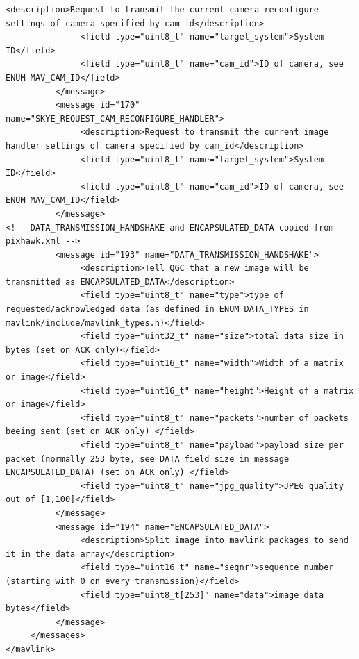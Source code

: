\begin{lstlisting}[captionpos=b, caption="Definition of \textsc{Skye} specific Mavlink messages", label=app_xml]
               <description>Request to transmit the current camera reconfigure settings of camera specified by cam_id</description>
               <field type="uint8_t" name="target_system">System ID</field>
               <field type="uint8_t" name="cam_id">ID of camera, see ENUM MAV_CAM_ID</field>
          </message>
          <message id="170" name="SKYE_REQUEST_CAM_RECONFIGURE_HANDLER">
               <description>Request to transmit the current image handler settings of camera specified by cam_id</description>
               <field type="uint8_t" name="target_system">System ID</field>
               <field type="uint8_t" name="cam_id">ID of camera, see ENUM MAV_CAM_ID</field>
          </message>
<!-- DATA_TRANSMISSION_HANDSHAKE and ENCAPSULATED_DATA copied from pixhawk.xml -->
          <message id="193" name="DATA_TRANSMISSION_HANDSHAKE">
               <description>Tell QGC that a new image will be transmitted as ENCAPSULATED_DATA</description>
               <field type="uint8_t" name="type">type of requested/acknowledged data (as defined in ENUM DATA_TYPES in mavlink/include/mavlink_types.h)</field>
               <field type="uint32_t" name="size">total data size in bytes (set on ACK only)</field>
               <field type="uint16_t" name="width">Width of a matrix or image</field>
               <field type="uint16_t" name="height">Height of a matrix or image</field>
               <field type="uint8_t" name="packets">number of packets beeing sent (set on ACK only) </field>
               <field type="uint8_t" name="payload">payload size per packet (normally 253 byte, see DATA field size in message ENCAPSULATED_DATA) (set on ACK only) </field>
               <field type="uint8_t" name="jpg_quality">JPEG quality out of [1,100]</field>
          </message>
          <message id="194" name="ENCAPSULATED_DATA">
               <description>Split image into mavlink packages to send it in the data array</description>
               <field type="uint16_t" name="seqnr">sequence number (starting with 0 on every transmission)</field>
               <field type="uint8_t[253]" name="data">image data bytes</field>
          </message>
     </messages>
</mavlink>
\end{lstlisting}